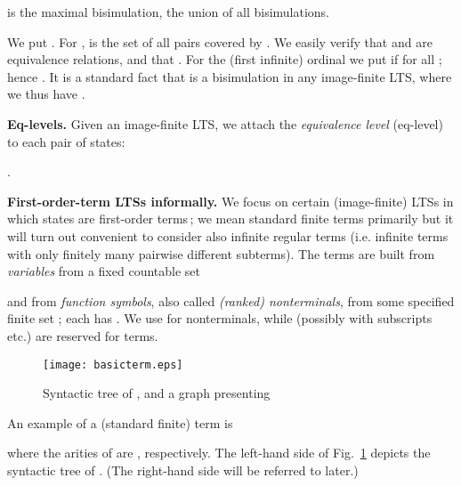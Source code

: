 \documentclass{llncs}
\begin{document}
is the maximal
bisimulation, the union of all bisimulations.


We put . For ,
 is the set of all pairs 
covered by . 
We easily verify that  and  are equivalence relations, and
that 
.
For the (first infinite) ordinal  we put 
 if  for all ; hence 
.
It is a standard fact
that
  is a bisimulation in any 
 image-finite LTS, where we thus have
.

\textbf{Eq-levels.} 
Given an image-finite LTS,
we attach 
the \emph{equivalence
level} (eq-level) to each pair of states:
\begin{center}
.
\end{center}




\textbf{First-order-term LTSs informally.}
We focus on certain (image-finite) LTSs in which states are
first-order terms\,; we mean standard finite terms primarily
but 
it will turn out convenient to consider also infinite regular terms
(i.e. infinite terms with only finitely many pairwise different subterms).
The terms are built from \emph{variables}
from a fixed countable set
\begin{center}

\end{center}
and from 
\emph{function symbols}, also called \emph{(ranked) nonterminals},
from some specified finite set ; each  has 
. We use   for
nonterminals, while  (possibly with subscripts etc.)
are reserved for terms.
\begin{figure}[t]
\centering
\texttt{[image: basicterm.eps]}
\caption{Syntactic tree of , and 
a graph presenting }
\label{fig:basicterm}
\end{figure}
An example of a (standard finite) term is  

where the arities of  are , respectively.
The left-hand side of Fig.~\ref{fig:basicterm} depicts the syntactic
tree of . (The right-hand side  will be referred to later.)
\end{document}
